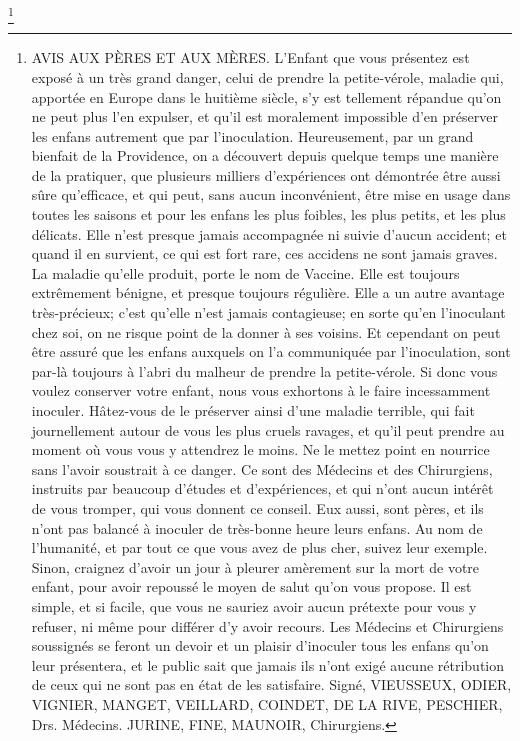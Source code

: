 \footnote{
AVIS AUX PÈRES ET AUX MÈRES.
L'Enfant que vous présentez est exposé à un très grand danger, celui de prendre la petite-vérole, maladie qui, apportée en Europe dans le huitième siècle, s'y est tellement répandue qu'on ne peut plus l'en expulser, et qu'il est moralement impossible d'en préserver les enfans autrement que par l'inoculation.
Heureusement, par un grand bienfait de la Providence, on a découvert depuis quelque temps une manière de la pratiquer, que plusieurs milliers d'expériences ont démontrée être aussi sûre qu'efficace, et qui peut, sans aucun inconvénient, être mise en usage dans toutes les saisons et pour les enfans les plus foibles, les plus petits, et les plus délicats. Elle n'est presque jamais accompagnée ni suivie d'aucun accident; et quand il en survient, ce qui est fort rare, ces accidens ne sont jamais graves.
La maladie qu'elle produit, porte le nom de Vaccine. Elle est toujours extrêmement bénigne, et presque toujours régulière. Elle a un autre avantage très-précieux; c'est qu'elle n'est jamais contagieuse; en sorte qu'en l'inoculant chez soi, on ne risque point de la donner à ses voisins. Et cependant on peut être assuré que les enfans auxquels on l'a communiquée par l'inoculation, sont par-là toujours à l'abri du malheur de prendre la petite-vérole.
Si donc vous voulez conserver votre enfant, nous vous exhortons à le faire incessamment inoculer. Hâtez-vous de le préserver ainsi d'une maladie terrible, qui fait journellement autour de vous les plus cruels ravages, et qu'il peut prendre au moment où vous vous y attendrez le moins. Ne le mettez point en nourrice sans l'avoir soustrait à ce danger.
Ce sont des Médecins et des Chirurgiens, instruits par beaucoup d'études et d'expériences, et qui n'ont aucun intérêt de vous tromper, qui vous donnent ce conseil. Eux aussi, sont pères, et ils n'ont pas balancé à inoculer de très-bonne heure leurs enfans.
Au nom de l'humanité, et par tout ce que vous avez de plus cher, suivez leur exemple. Sinon, craignez d'avoir un jour à pleurer amèrement sur la mort de votre enfant, pour avoir repoussé le moyen de salut qu'on vous propose. Il est simple, et si facile, que vous ne sauriez avoir aucun prétexte pour vous y refuser, ni même pour différer d'y avoir recours.
Les Médecins et Chirurgiens soussignés se feront un devoir et un plaisir d'inoculer tous les enfans qu'on leur présentera, et le public sait que jamais ils n'ont exigé aucune rétribution de ceux qui ne sont pas en état de les satisfaire.
Signé, VIEUSSEUX, ODIER, VIGNIER, MANGET, VEILLARD, COINDET, DE LA RIVE, PESCHIER, Drs. Médecins. JURINE, FINE, MAUNOIR, Chirurgiens.
}
